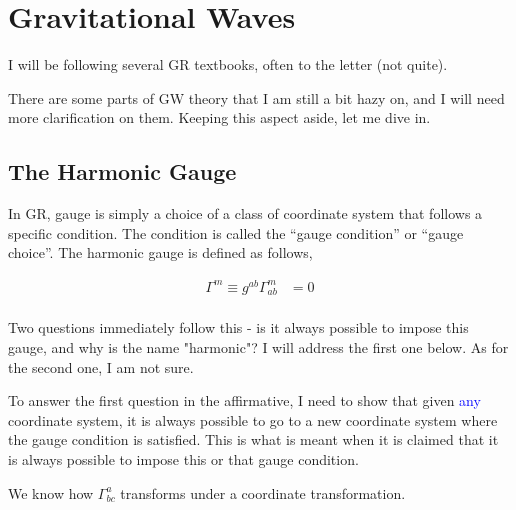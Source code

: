 \chapter{Gravitational Waves}
\label{ch:gw}
I will be following several GR textbooks, often to the letter (not quite). 

There are some parts of GW theory that I am still a bit hazy on, and I will need more clarification on them. Keeping this aspect aside, let me dive in.


\section{The Harmonic Gauge}

In GR, gauge is simply a choice of a class of coordinate system that follows a specific condition. The condition is called the ``gauge condition'' or ``gauge choice''. The harmonic gauge is defined as follows,

\begin{align*}
    \Gamma^m \equiv g^{ab} \Gamma^m_{ab} &=0 \\
\end{align*}


Two questions immediately follow this - is it always possible to impose this gauge, and why is the name "harmonic"? I will address the first one below. As for the second one, I am not sure.

To answer the first question in the affirmative, I need to show that given \textcolor{blue}{any} coordinate system, it is always possible to go to a new coordinate system where the gauge condition is satisfied. This is what is meant when it is claimed that it is always possible to impose this or that gauge condition.


We know how $\Gamma^a_{bc}$ transforms under a coordinate transformation.

